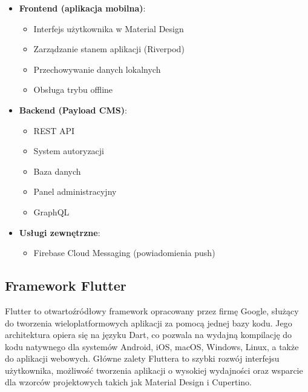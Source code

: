 \begin{itemize}
	\item \textbf{Frontend (aplikacja mobilna)}:
	      \begin{itemize}
		      \item Interfejs użytkownika w Material Design
		      \item Zarządzanie stanem aplikacji (Riverpod)
		      \item Przechowywanie danych lokalnych
		      \item Obsługa trybu offline
	      \end{itemize}

	\item \textbf{Backend (Payload CMS)}:
	      \begin{itemize}
		      \item REST API
		      \item System autoryzacji
		      \item Baza danych
		      \item Panel administracyjny
		      \item GraphQL
	      \end{itemize}

	\item \textbf{Usługi zewnętrzne}:
	      \begin{itemize}
		      \item Firebase Cloud Messaging (powiadomienia push)
	      \end{itemize}
\end{itemize}

\subsection{Framework Flutter}

Flutter to otwartoźródłowy framework opracowany przez firmę Google, służący do tworzenia wieloplatformowych aplikacji za pomocą jednej bazy kodu. Jego architektura opiera się na języku Dart, co pozwala na wydajną kompilację do kodu natywnego dla systemów Android, iOS, macOS, Windows, Linux, a także do aplikacji webowych. Główne zalety Fluttera to szybki rozwój interfejsu użytkownika, możliwość tworzenia aplikacji o wysokiej wydajności oraz wsparcie dla wzorców projektowych takich jak Material Design i Cupertino.

